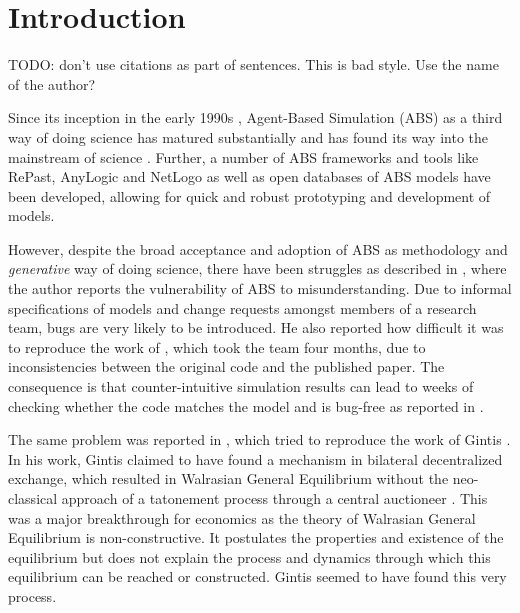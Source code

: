 \section{Introduction}
\label{sec:introduction}
TODO: don't use citations as part of sentences. This is bad style. Use the name of the author?


Since its inception in the early 1990s \cite{epstein_growing_1996,siebers_introduction_2008,wooldridge_introduction_2009}, Agent-Based Simulation (ABS) as a third way of doing science \cite{axelrod_advancing_1997,axelrod_guide_2006} has matured substantially and has found its way into the mainstream of science \cite{macal_everything_2016}. Further, a number of ABS frameworks and tools like RePast, AnyLogic and NetLogo as well as open databases of ABS models \cite{openabm_model_database}
have been developed, allowing for quick and robust prototyping and development of models.  

However, despite the broad acceptance and adoption of ABS as methodology and \textit{generative} way of doing science, there have been struggles as described in \cite{axelrod_chapter_2006}, where the author reports the vulnerability of ABS to misunderstanding. Due to informal specifications of models and change requests amongst members of a research team, bugs are very likely to be introduced. He also reported how difficult it was to reproduce the work of \cite{axelrod_convergence_1995}, which took the team four months, due to inconsistencies between the original code and the published paper. The consequence is that counter-intuitive simulation results can lead to weeks of checking whether the code matches the model and is bug-free as reported in \cite{axelrod_advancing_1997}.

The same problem was reported in \cite{ionescu_dependently-typed_2012}, which tried to reproduce the work of Gintis \cite{gintis_emergence_2006}. In his work, Gintis claimed to have found a mechanism in bilateral decentralized exchange, which resulted in Walrasian General Equilibrium without the neo-classical approach of a tatonement process through a central auctioneer \cite{colell_microeconomic_1995}. This was a major breakthrough for economics as the theory of Walrasian General Equilibrium is non-constructive. It postulates the properties and existence of the equilibrium but does not explain the process and dynamics through which this equilibrium can be reached or constructed. Gintis seemed to have found this very process.

